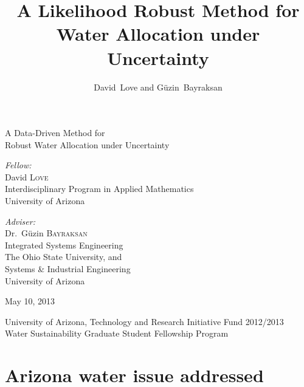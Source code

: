 \documentclass[12pt]{amsart}
\author{David~Love and G\"{u}zin~Bayraksan}
\title{A Likelihood Robust Method for Water Allocation under Uncertainty}
\date{}
\begin{document}
\begin{titlepage}
\begin{center}

\vspace*{4cm}

{ \huge A Data-Driven Method for\medskip\\ Robust Water Allocation under Uncertainty}\\%

\vspace{3cm}

\begin{minipage}{0.45\textwidth}
\begin{flushleft} \large
\emph{Fellow:}\\
 David \textsc{Love}\\
 Interdisciplinary Program in Applied Mathematics\\
 University of Arizona
\end{flushleft}
\end{minipage}
\begin{minipage}{0.45\textwidth}
\begin{flushright} \large
\emph{Adviser:} \\
 Dr.~G\"{u}zin \textsc{Bayraksan}\\
 Integrated Systems Engineering\\
 The Ohio State University, and\\
 Systems \& Industrial Engineering\\
 University of Arizona
\end{flushright}
\end{minipage}

\vspace{2cm}

{\large May 10, 2013}

\vspace{2cm}

{\large University of Arizona, Technology and Research Initiative Fund 2012/2013\\Water Sustainability Graduate Student Fellowship Program}

\end{center}
\end{titlepage}

\section{Arizona water issue addressed}
\end{document}
